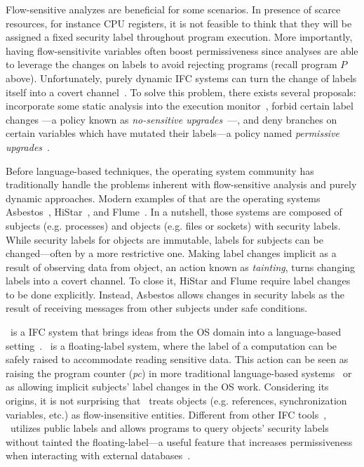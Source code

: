 
Flow-sensitive analyzes are beneficial for some scenarios. In presence of scarce
resources, for instance CPU registers, it is not feasible to think that they
will be assigned a fixed security label throughout program execution. More
importantly, having flow-sensitivite variables often boost permissiveness since
analyses are able to leverage the changes on labels to avoid rejecting programs
(recall program $P$ above). Unfortunately, purely dynamic IFC systems can turn
the change of labels itself into a covert channel~\citep{Russo:2010}. To solve
this problem, there exists several proposals: incorporate some static analysis
into the execution monitor~\citep{Russo:2010}, forbid certain label changes ---a
policy known as \emph{no-sensitive upgrades}~\citep{Austin:Flanagan:PLAS10}---,
and deny branches on certain variables which have mutated their labels---a
policy named \emph{permissive upgrades}~\citep{Austin:Flanagan:PLAS10}. 

Before language-based techniques, the operating system community has
traditionally handle the problems inherent with flow-sensitive analysis and
purely dynamic approaches. Modern examples of that are the operating systems
Asbestos~\citep{Efstathopoulos:2005}, HiStar~\citep{zeldovich:histar}, and
Flume~\citep{krohn:flume}. In a nutshell, those systems are composed of subjects
(e.g. processes) and objects (e.g. files or sockets) with security labels. While
security labels for objects are immutable, labels for subjects can be
changed---often by a more restrictive one. Making label changes implicit as a
result of observing data from object, an action known as \emph{tainting}, turns
changing labels into a covert channel. To close it, HiStar and Flume require
label changes to be done explicitly. Instead, Asbestos allows changes in 
security labels as the result of receiving messages from other subjects  
under safe conditions.

\LIO~is a IFC system that brings ideas from the OS domain into a language-based
setting~\citep{stefan:lio,stefan:addressing-covert}.  \LIO~is a floating-label
system, where the label of a computation can be safely raised to accommodate
reading sensitive data. This action can be seen as raising the program counter
(\emph{pc}) in more traditional language-based
systems~\citep{sabelfeld:language-based-iflow} or as allowing implicit subjects'
label changes in the OS work. Considering its origins, it is not surprising that
\LIO~treats objects (e.g. references, synchronization variables, etc.) as
flow-insensitive entities. Different from other IFC
tools~\citep{jif,FlowCaml,Hedin13}, \LIO~utilizes public labels and allows
programs to query objects' security labels without tainted the
floating-label---a useful feature that increases permissiveness when interacting
with external databases~\citep{giffin:hails}.

